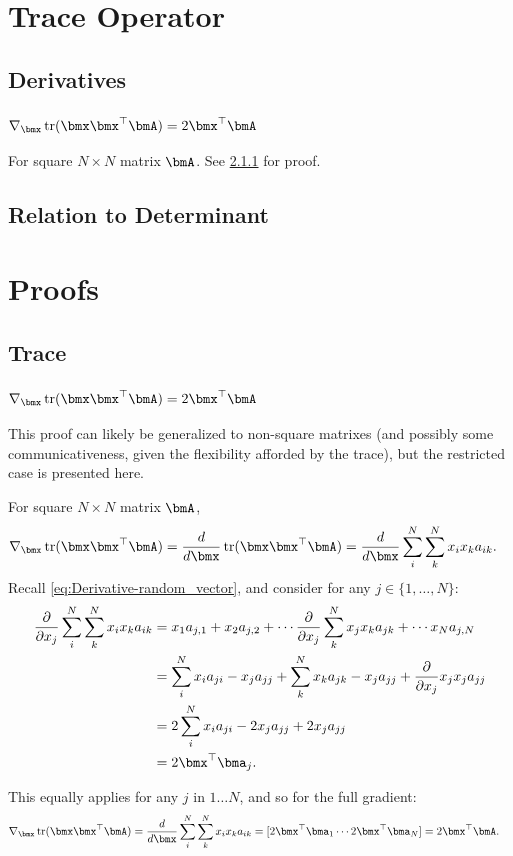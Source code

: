 \documentclass[11pt]{article}
\DeclareMathOperator{\Trace}{tr}
\begin{document}
\section{Trace Operator}
\subsection{Derivatives}
\subsubsection{$\nabla_{\bmx}\Trace(\bmx \bmx^\top \bmA) = 2\bmx^\top \bmA$}
\label{sec:Trace-Derivative-tr(xx'A)}
For square $N\times N$ matrix $\bmA$.
See \cref{proof:Trace-Derivative-tr(xx'A)} for proof.

\subsection{Relation to Determinant}

\appendix
\section{Proofs}
\subsection{Trace}
\subsubsection{\hyperref[sec:Trace-Derivative-tr(xx'A)]{$\nabla_{\bmx}\Trace(\bmx \bmx^\top \bmA) = 2\bmx^\top \bmA$}}
\label{proof:Trace-Derivative-tr(xx'A)}
This proof can likely be generalized to non-square matrixes (and possibly some communicativeness, given the flexibility afforded by the trace), but the restricted case is presented here.

For square $N\times N$ matrix $\bmA$,
\begin{align*}
\nabla_{\bmx}\Trace(\bmx \bmx^\top \bmA) =
\frac{d}{d \bmx}\Trace(\bmx \bmx^\top \bmA) &=
\frac{d}{d \bmx} \sum_{i}^{N} \sum_{k}^{N} x_i x_k a_{ik}.
\end{align*}
Recall \cref{eq:Derivative-random_vector}, and consider for any $j \in \{1,\ldots, N\}$:
\begin{align*}
\frac{\partial}{\partial x_j} \sum_{i}^{N} \sum_{k}^{N} x_i x_k a_{ik} &=
x_1a_{j,1} + x_2a_{j,2} + \cdots \frac{\partial}{\partial x_j} \sum_{k}^{N} x_j x_k a_{jk} + \cdots x_N a_{j, N} \\
&= \sum_i^N x_ia_{ji} - x_ja_{jj} + \sum_{k}^{N} x_k a_{jk} - x_ja_{jj} + \frac{\partial}{\partial x_j} x_j x_j a_{jj} \\
&= 2\sum_i^N x_ia_{ji} - 2 x_ja_{jj} + 2 x_ja_{jj} \\
&= 2\bmx^\top \bma_j.
\end{align*}

This equally applies for any $j$ in $1\ldots N$, and so for the full gradient:
\begin{align*}
\nabla_{\bmx}\Trace(\bmx \bmx^\top \bmA) =
\frac{d}{d \bmx} \sum_{i}^{N} \sum_{k}^{N} x_i x_k a_{ik} &=
[2 \bmx^\top \bma_1 \cdots 2\bmx^\top \bma_N] = 2\bmx^\top \bmA.
\end{align*}
\end{document}
